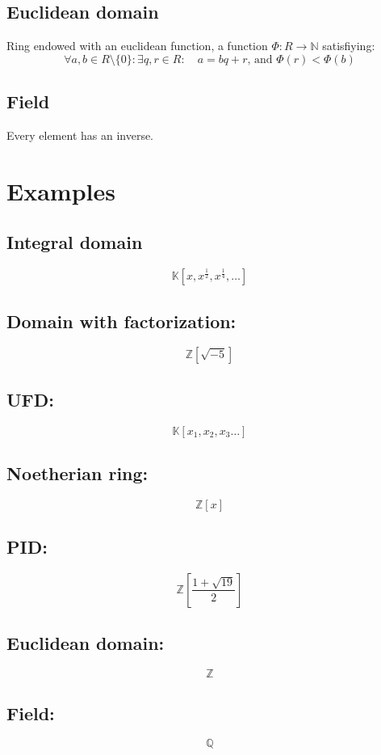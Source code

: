 \documentclass[paper=a4, fontsize=10pt, spanish]{scrartcl}
\numberwithin{equation}{section} %
\numberwithin{figure}{section} %
\numberwithin{table}{section} %
\begin{document}
   \subsection*{Euclidean domain}
     Ring endowed with an euclidean function, a function $\Phi: R \rightarrow \mathbb{N}$ satisfiying:
     \[ \forall a,b \in R\setminus\{0\}: \exists q,r \in R: \quad a = bq + r \mbox{, and } \Phi(r) < \Phi(b) \]
   \subsection*{Field}
     Every element has an inverse.
    
 \section*{Examples}
   \subsection*{Integral domain}
     \[ \mathbb{K}\left[x,x^{\frac{1}{2}},x^{\frac{1}{4}}, \dots\right] \]
   \subsection*{Domain with factorization:}
     \[ \mathbb{Z}\left[\sqrt{-5}\right] \]
   \subsection*{UFD:}
     \[ \mathbb{K}\left[x_1,x_2,x_3\dots\right] \]
   \subsection*{Noetherian ring:}
     \[ \mathbb{Z}[x] \]
   \subsection*{PID:}
     \[ \mathbb{Z}\left[\scriptstyle{\frac{1+\sqrt{19}}{2}}\right] \]
   \subsection*{Euclidean domain:}
     \[ \mathbb{Z} \]
   \subsection*{Field:}
     \[ \mathbb{Q} \]
\end{document}
